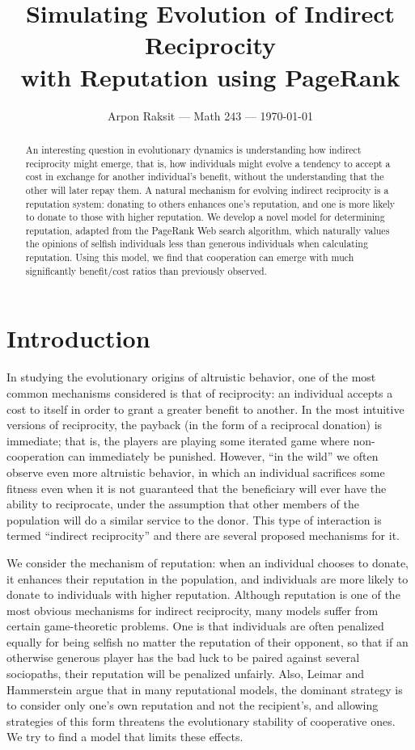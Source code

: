 \documentclass{amsart}
\title[Simulating indirect reciprocity using PageRank]{Simulating
  Evolution of Indirect Reciprocity \\ with Reputation using PageRank}
\author{Arpon Raksit --- Math 243 --- \today}
\begin{document}
\begin{abstract}
An interesting question in evolutionary dynamics is understanding how
indirect reciprocity might emerge, that is, how individuals might
evolve a tendency to accept a cost in exchange for another
individual's benefit, without the understanding that the other will
later repay them. A natural mechanism for evolving indirect
reciprocity is a reputation system: donating to others enhances one's
reputation, and one is more likely to donate to those with higher
reputation. We develop a novel model for determining reputation,
adapted from the PageRank Web search algorithm, which naturally values
the opinions of selfish individuals less than generous individuals
when calculating reputation. Using this model, we find that
cooperation can emerge with much significantly benefit/cost ratios
than previously observed.
\end{abstract}

\maketitle
\thispagestyle{fancy}

\section{Introduction}

In studying the evolutionary origins of altruistic behavior, one of
the most common mechanisms considered is that of reciprocity: an
individual accepts a cost to itself in order to grant a greater
benefit to another. In the most intuitive versions of reciprocity, the
payback (in the form of a reciprocal donation) is immediate; that is,
the players are playing some iterated game where non-cooperation can
immediately be punished. However, ``in the wild'' we often observe
even more altruistic behavior, in which an individual sacrifices some
fitness even when it is not guaranteed that the beneficiary will ever
have the ability to reciprocate, under the assumption that other
members of the population will do a similar service to the donor. This
type of interaction is termed ``indirect reciprocity'' and there are
several proposed mechanisms for it.

We consider the mechanism of reputation: when an individual chooses to
donate, it enhances their reputation in the population, and
individuals are more likely to donate to individuals with higher
reputation. Although reputation is one of the most obvious mechanisms
for indirect reciprocity, many models suffer from certain
game-theoretic problems. One is that individuals are often penalized
equally for being selfish no matter the reputation of their opponent,
so that if an otherwise generous player has the bad luck to be paired
against several sociopaths, their reputation will be penalized
unfairly. Also, Leimar and Hammerstein \cite{leimar_evolution_2001}
argue that in many reputational models, the dominant strategy is to
consider only one's own reputation and not the recipient's, and
allowing strategies of this form threatens the evolutionary stability
of cooperative ones. We try to find a model that limits these effects.
\end{document}
